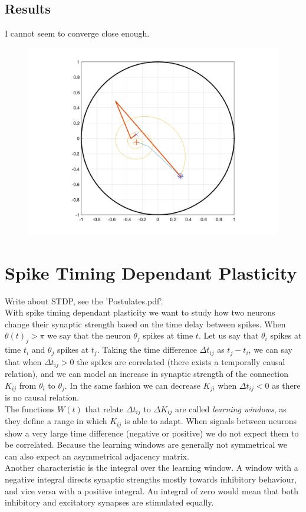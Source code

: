 \subsection{Results}
I cannot seem to converge close enough.
\begin{figure}[H]
\centering
\includegraphics[width = \textwidth]{../Figures/ProblemsWithNewtonRaphson.png}
\end{figure}


\section{Spike Timing Dependant Plasticity}
Write about STDP, see the 'Postulates.pdf'. \\

With spike timing dependant plasticity we want to study how two neurons change their synaptic strength based on the time delay between spikes. When $\theta(t)_j > \pi$ we say that the neuron $\theta_j$ spikes at time $t$. 
Let us say that $\theta_i$ spikes at time $t_i$ and $\theta_j$ spikes at $t_j$. Taking the time difference $\Delta t_{ij}$ as $t_j - t_i$, we can say that when $\Delta t_{ij} > 0$ the spikes are correlated (there exists a temporally causal relation), and we can model an increase in synaptic strength of the connection $K_{ij}$ from $\theta_i$ to $\theta_j$. In the same fashion we can decrease $K_{ji}$ when $\Delta t_{ij} < 0$ as there is no causal relation. \\
The functions $W(t)$ that relate $\Delta t_{ij}$ to $\Delta K_{ij}$ are called \textsl{learning windows},  as they define a range in which $K_{ij}$ is able to adapt. When signals between neurons show a very large time difference (negative or positive) we do not expect them to be correlated. Because the learning windows are generally not symmetrical we can also expect an asymmetrical adjacency matrix.\\
Another characteristic is the integral over the learning window. A window with a negative integral directs synaptic strengths mostly towards inhibitory behaviour, and vice versa with a positive integral. An integral of zero would mean that both inhibitory and excitatory synapses are stimulated equally.\\

